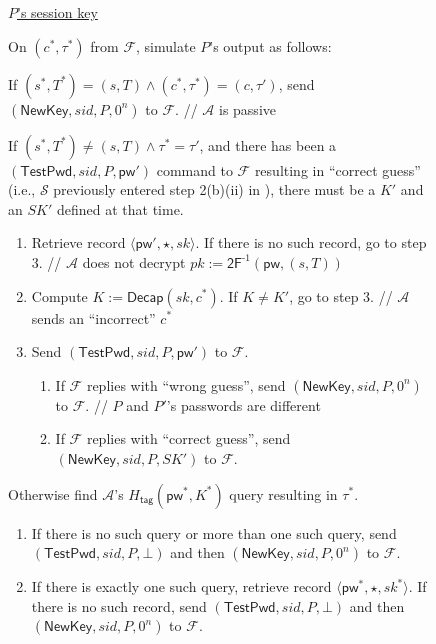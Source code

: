\documentclass{article}
\theoremstyle{plain}
\theoremstyle{definition}
\theoremstyle{remark}
\newcommand{\adv}{\mathcal{A}}
\renewcommand{\sim}{\mathcal{S}}
\newcommand{\func}{\mathcal{F}}
\newcommand{\Decap}{\mathsf{Decap}}
\newcommand{\Htag}{H_\mathsf{tag}}
\newcommand{\pw}{\mathsf{pw}}
\newcommand{\TestPwd}{\mathsf{TestPwd}}
\newcommand{\NewKey}{\mathsf{NewKey}}
\begin{document}
\begin{figure}[H]
\begin{framed}
\begin{small}
\underline{$P$'s session key}

\medskip
On $(c^*,\tau^*)$ from $\func$, simulate $P$'s output as follows:
\begin{enumerate}
  \item If $(s^*,T^*) = (s,T) \land (c^*,\tau^*) = (c,\tau')$, send $(\NewKey, sid, P, 0^n)$ to $\func$. \textcolor[gray]{0.5}{// $\adv$ is passive}
  {\color{blue}\item If $(s^*,T^*) \neq (s,T) \land \tau^* = \tau'$, and there has been a $(\TestPwd, sid, P, \pw')$ command to $\func$ resulting in ``correct guess'' (i.e., $\sim$ previously entered step 2(b)(ii) in ), there must be a $K'$ and an $SK'$ defined at that time.
      \begin{enumerate}
        \item Retrieve record $\langle\pw',\star,sk\rangle$. If there is no such record, go to step 3. \quad \textcolor[gray]{0.5}{// $\adv$ does not decrypt $pk := \mathsf{2F}^{\text{-}1}(\pw,(s,T))$}
        \item Compute $K := \Decap(sk,c^*)$. If $K \neq K'$, go to step 3. \quad \textcolor[gray]{0.5}{// $\adv$ sends an ``incorrect'' $c^*$}
        \item Send $(\TestPwd, sid, P, \pw')$ to $\func$.
            \begin{enumerate}
              \item If $\func$ replies with ``wrong guess'', send $(\NewKey, sid, P, 0^n)$ to $\func$. \quad \textcolor[gray]{0.5}{// $P$ and $P'$'s passwords are different}
              \item If $\func$ replies with ``correct guess'', send $(\NewKey, sid, P, SK')$ to $\func$.
            \end{enumerate}
      \end{enumerate}
  }
  \item Otherwise find $\adv$'s {\color{blue}$\Htag(\pw^*,K^*)$} query resulting in $\tau^*$.
      \begin{enumerate}
        \item If there is no such query or more than one such query, send $(\TestPwd, sid, P, \bot)$ and then $(\NewKey, sid, P, 0^n)$ to $\func$.
        \item If there is exactly one such query, retrieve record $\langle\pw^*,\star,sk^*\rangle$. If there is no such record, send $(\TestPwd, sid, P, \bot)$ and then $(\NewKey, sid, P, 0^n)$ to $\func$.

\end{enumerate}
\end{enumerate}
\end{small}
\end{framed}
\end{figure}
\end{document}
